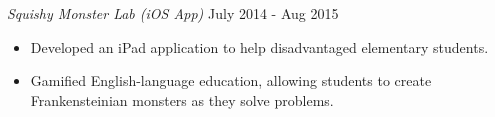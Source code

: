 {\sl Squishy Monster Lab (iOS App)} \hfill July 2014 - Aug 2015
\begin{itemize} \itemsep -2pt %
  \item Developed an iPad application to help disadvantaged elementary students.

  \item Gamified English-language education, allowing students to create
  Frankensteinian monsters as they solve problems.
\end{itemize}
